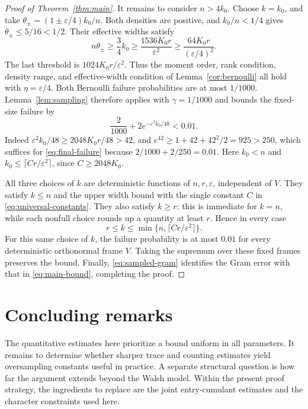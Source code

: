 \documentclass[11pt]{article}
\theoremstyle{definition}
\theoremstyle{remark}
\theoremstyle{plain}
\begin{document}
\begin{proof}[Proof of Theorem~\ref{thm:main}]
It remains to consider $n>4k_0$. Choose $k=k_0$, and take
\(\theta_\pm=(1\pm\varepsilon/4)k_0/n\).
Both densities are positive, and $k_0/n<1/4$ gives
$\theta_\pm\le5/16<1/2$. Their effective widths satisfy
\begin{equation}\label{eq:bernoulli-widths}
 n\theta_\pm\ge\frac34 k_0
 \ge\frac{1536K_0r}{\varepsilon^2}
 \ge\frac{64K_0r}{(\varepsilon/4)^2}.
\end{equation}
The last threshold is $1024K_0r/\varepsilon^2$. Thus the moment
order, rank condition, density range, and effective-width condition
of Lemma~\ref{cor:bernoulli} all hold with $\eta=\varepsilon/4$.
Both Bernoulli failure probabilities are at most $1/1000$.
Lemma~\ref{lem:sampling} therefore applies with $\gamma=1/1000$
and bounds the fixed-size failure by
\begin{equation}\label{eq:final-failure}
             \frac2{1000}+2e^{-\varepsilon^2k_0/48}<0.01.
\end{equation}
Indeed \(\varepsilon^2k_0/48\ge2048K_0r/48>42\), and
\(e^{42}\ge1+42+42^2/2=925>250\), which suffices for \eqref{eq:final-failure}
because $2/1000+2/250=0.01$. Here $k_0<n$ and
$k_0\le\lceil Cr/\varepsilon^2\rceil$, since $C\ge2048K_0$.

All three choices of $k$ are deterministic functions of
$n,r,\varepsilon$, independent of $V$. They satisfy $k\le n$
and the upper width bound with the single constant $C$ in
\eqref{eq:universal-constants}. They also satisfy $k\ge r$:
this is immediate for $k=n$, while each nonfull choice rounds up
a quantity at least $r$. Hence in every case
\[
 r\le k\le\min\{n,\lceil Cr/\varepsilon^2\rceil\}.
\]
For this same choice of $k$, the failure probability is at most
$0.01$ for every deterministic orthonormal frame $V$. Taking the
supremum over these fixed frames preserves the bound. Finally,
\eqref{eq:sampled-gram} identifies the Gram error with that in
\eqref{eq:main-bound}, completing the proof.
\end{proof}

\section{Concluding remarks}\label{sec:conclusion}

The quantitative estimates here prioritize a bound uniform in all
parameters. It remains to determine whether sharper trace and counting
estimates yield oversampling constants useful in practice. A separate
structural question is how far the argument extends beyond the Walsh
model. Within the present proof strategy, the ingredients to replace
are the joint entry-cumulant estimates and the character constraints
used here.
\end{document}
